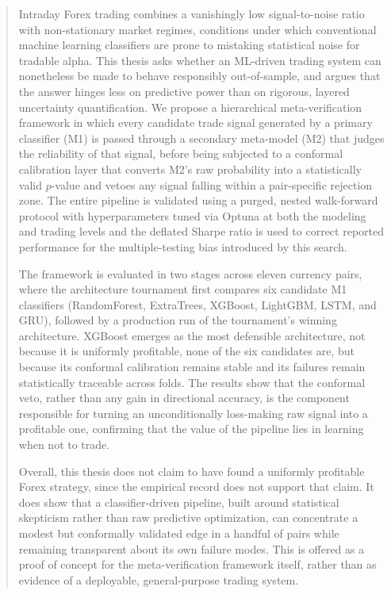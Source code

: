 \documentclass[12pt, a4paper]{article}
\begin{document}
\pagebreak

\setcounter{page}{1}

\begin{abstract}
Intraday Forex trading combines a vanishingly low signal-to-noise ratio with non-stationary market regimes, conditions under which conventional machine learning
classifiers are prone to mistaking statistical noise for tradable alpha. This thesis asks whether an ML-driven trading system can nonetheless be made to behave
responsibly out-of-sample, and argues that the answer hinges less on predictive power than on rigorous, layered uncertainty quantification. We propose a
hierarchical meta-verification framework in which every candidate trade signal generated by a primary classifier (M1) is passed through a secondary meta-model
(M2) that judges the reliability of that signal, before being subjected to a conformal calibration layer that converts M2's raw probability into a statistically
valid $p$-value and vetoes any signal falling within a pair-specific rejection zone. The entire pipeline is validated using a purged, nested walk-forward
protocol with hyperparameters tuned via Optuna at both the modeling and trading levels and the deflated Sharpe ratio is used to correct reported performance
for the multiple-testing bias introduced by this search.

\medskip

The framework is evaluated in two stages across eleven currency pairs, where the architecture tournament first compares six candidate M1 classifiers (RandomForest,
ExtraTrees, XGBoost, LightGBM, LSTM, and GRU), followed by a production run of the tournament's winning architecture. XGBoost emerges as the most defensible
architecture, not because it is uniformly profitable, none of the six candidates are, but because its conformal calibration remains stable and its failures
remain statistically traceable across folds. The results show that the conformal veto, rather than any gain in directional accuracy, is the component
responsible for turning an unconditionally loss-making raw signal into a profitable one, confirming that the value of the pipeline lies in learning when not
to trade.

\medskip

Overall, this thesis does not claim to have found a uniformly profitable Forex strategy, since the empirical record does not support that claim. It does show that a
classifier-driven pipeline, built around statistical skepticism rather than raw predictive optimization, can concentrate a modest but conformally validated
edge in a handful of pairs while remaining transparent about its own failure modes. This is offered as a proof of concept for the meta-verification framework
itself, rather than as evidence of a deployable, general-purpose trading system.
\end{abstract}
\end{document}

